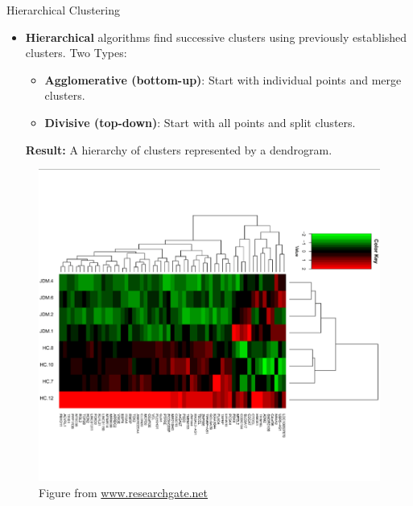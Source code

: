 \documentclass[serif, aspectratio=169]{beamer}
\begin{document}
\begin{frame}{Hierarchical Clustering}
    
    \begin{itemize}
    \item \textbf{ Hierarchical} algorithms find successive clusters using previously established clusters. Two Types:
        \begin{itemize}
            
        \item \textbf{Agglomerative (bottom-up)}: Start with individual points and merge clusters.
        \item \textbf{Divisive (top-down)}: Start with all points and split clusters.
        \end{itemize}
    \textbf{Result:} A hierarchy of clusters represented by a dendrogram.
    \end{itemize}
    \begin{figure}
        \centering
        \includegraphics[scale=0.30]{pic/figs/Unsupervised-hierarchical-clustering-analysis-of-gene-expression.png}
        \caption{Figure from \href{https://www.researchgate.net/publication/334433467_Plasma_exosomes_from_children_with_juvenile_dermatomyositis_are_taken_up_by_human_aortic_endothelial_cells_and_are_associated_with_altered_gene_expression_in_those_cells}{www.researchgate.net}}
    \end{figure}
\end{frame}
\end{document}
